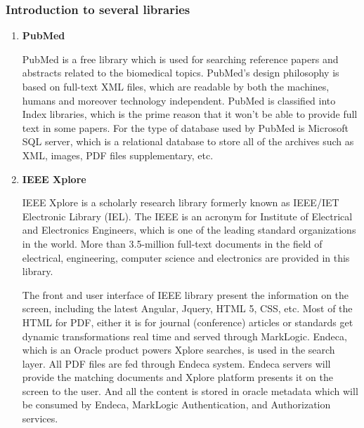 \subsubsection{Introduction to several libraries }
\begin{enumerate}
	\item\textbf{PubMed}
	\setlength{\parindent}{2em}
		
	 PubMed is a free library which is used for searching reference papers and abstracts related to the biomedical topics. PubMed’s design philosophy is based on full-text XML files, which are readable by both the machines, humans and moreover technology independent. PubMed is classified into Index libraries, which is the prime reason that it won’t be able to provide full text in some papers. For the type of database used by PubMed is Microsoft SQL server, which is a relational database to store all of the archives such as XML, images, PDF files supplementary, etc. 
	
	
	\item\textbf{IEEE Xplore}
	\setlength{\parindent}{2em}
	
	IEEE Xplore is a scholarly research library formerly known as IEEE/IET Electronic Library (IEL). The IEEE is an acronym for Institute of Electrical and Electronics Engineers, which is one of the leading standard organizations in the world. More than 3.5-million full-text documents in the field of electrical, engineering, computer science and electronics are provided in this library. 
	
	The front and user interface of IEEE library present the information on the screen, including the latest Angular, Jquery, HTML 5, CSS, etc. Most of the HTML for PDF, either it is for journal (conference) articles or standards get dynamic transformations real time and served through MarkLogic. Endeca, which is an Oracle product powers Xplore searches, is used in the search layer. All PDF files are fed through Endeca system. Endeca servers will provide the matching documents and Xplore platform presents it on the screen to the user. And all the content is stored in oracle metadata which will be consumed by Endeca, MarkLogic Authentication, and Authorization services.
	
\end{enumerate}

